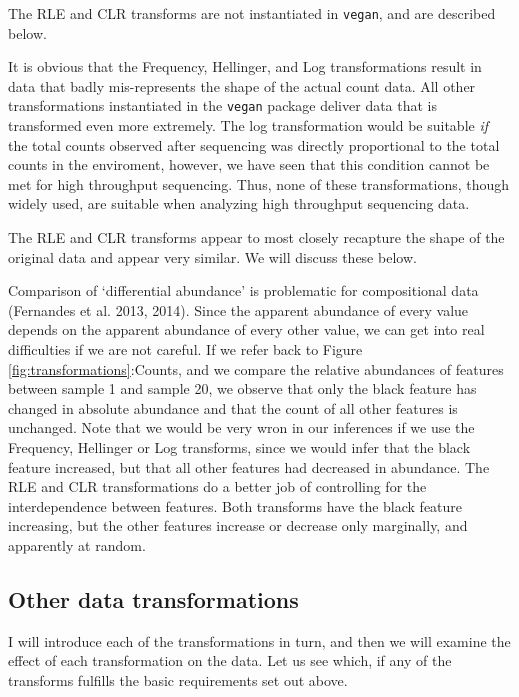 \documentclass[onecolumn]{article}
\begin{document}
The RLE and CLR transforms are not instantiated in \texttt{vegan}, and are described below.

It is obvious that the Frequency, Hellinger, and Log transformations result in data that badly mis-represents the shape of the actual count data. All other transformations instantiated in the \texttt{vegan} package deliver data that is transformed even more extremely. The log transformation would be suitable \emph{if} the total counts observed after sequencing was directly proportional to the total counts in the enviroment, however, we have seen that this condition cannot be met for high throughput sequencing. Thus, none of these transformations, though widely used, are suitable when analyzing high throughput sequencing data.

The RLE and CLR transforms appear to most closely recapture the shape of the original data and appear very similar. We will discuss these below.

Comparison of `differential abundance' is problematic for compositional data (Fernandes et al. 2013, 2014). Since the apparent abundance of every value depends on the apparent abundance of every other value, we can get into real difficulties if we are not careful. If we refer back to Figure \ref{fig:transformations}:Counts, and we compare the relative abundances of features between sample 1 and sample 20, we observe that only the black feature has changed in absolute abundance and that the count of all other features is unchanged. Note that we would be very wron in our inferences if we use the Frequency, Hellinger or Log transforms, since we would infer that the black feature increased, but that all other features had decreased in abundance. The RLE and CLR transformations do a better job of controlling for the interdependence between features. Both transforms have the black feature increasing, but the other features increase or decrease only marginally, and apparently at random.

\hypertarget{other-data-transformations}{%
\subsection{Other data transformations}\label{other-data-transformations}}

I will introduce each of the transformations in turn, and then we will examine the effect of each transformation on the data. Let us see which, if any of the transforms fulfills the basic requirements set out above.
\end{document}
